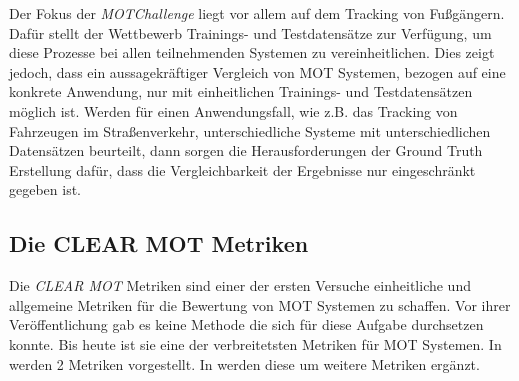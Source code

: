 Der Fokus der \textit{MOTChallenge} liegt vor allem auf dem \gls{Tracking} von Fußgängern. Dafür stellt der Wettbewerb Trainings- und Testdatensätze zur Verfügung, um diese Prozesse bei allen teilnehmenden Systemen zu vereinheitlichen. Dies zeigt jedoch, dass ein aussagekräftiger Vergleich von \gls{MOT} Systemen, bezogen auf eine konkrete Anwendung, nur mit einheitlichen Trainings- und Testdatensätzen möglich ist. Werden für einen Anwendungsfall, wie z.B. das \gls{Tracking} von Fahrzeugen im Straßenverkehr, unterschiedliche Systeme mit unterschiedlichen Datensätzen beurteilt, dann sorgen die Herausforderungen der \gls{Ground Truth} Erstellung dafür, dass die Vergleichbarkeit der Ergebnisse nur eingeschränkt gegeben ist. 

\subsection{Die CLEAR MOT Metriken}
Die \textit{\acrshort{CLEAR} \gls{MOT}} Metriken sind einer der ersten Versuche einheitliche und allgemeine Metriken für die Bewertung von \gls{MOT} Systemen zu schaffen. Vor ihrer Veröffentlichung gab es keine Methode die sich für diese Aufgabe durchsetzen konnte. Bis heute ist sie eine der verbreitetsten Metriken für \gls{MOT} Systemen. In \cite{CLEAR.2008} werden 2 Metriken vorgestellt. In \cite{Kasturi.2009} werden diese um weitere Metriken ergänzt. \par

